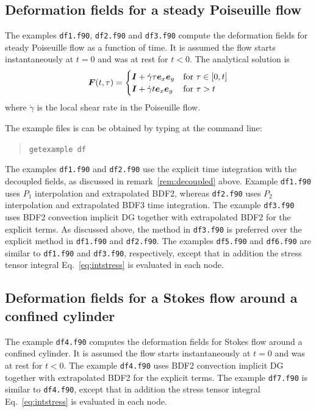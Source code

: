 \subsection{Deformation fields for a steady Poiseuille flow}
\label{sec:df_Poiseuille_steady}

The examples \texttt{df1.f90}, \texttt{df2.f90} and \texttt{df3.f90} compute the deformation fields for steady Poiseuille flow as a function of time. It is assumed the flow starts instantaneously at $t=0$ and was at rest for $t<0$. The analytical solution is 
\begin{equation}
    \boldsymbol{F}(t,\tau) = 
\begin{cases}
      \boldsymbol{I} + \dot\gamma\tau\boldsymbol{e}_x\boldsymbol{e}_y  & \text{for }\tau \in [0,t] \\
      \boldsymbol{I} + \dot\gamma t \boldsymbol{e}_x\boldsymbol{e}_y & \text{for }\tau > t
\end{cases}
\label{eq:steadyFshear}
\end{equation}
where $\dot\gamma$ is the local shear rate in the Poiseuille flow.

The example files is can be obtained by typing at the
command line:
\medskip
\begin{quote}
   \texttt{getexample df}
\end{quote}

The examples \texttt{df1.f90} and \texttt{df2.f90} use the explicit time integration with the decoupled fields, as discussed in remark~\ref{rem:decoupled} above. 
Example \texttt{df1.f90} uses $P_1$ interpolation and 
extrapolated BDF2, whereas \texttt{df2.f90} uses $P_2$ interpolation and 
extrapolated BDF3 time integration. The example \texttt{df3.f90} uses BDF2 convection implicit DG together with extrapolated BDF2 for the explicit terms. As discussed above, the method in \texttt{df3.f90} is preferred over the explicit method in \texttt{df1.f90} and \texttt{df2.f90}.
The examples \texttt{df5.f90} and \texttt{df6.f90} are similar to \texttt{df1.f90} and \texttt{df3.f90}, respectively, except that in addition the stress tensor 
integral Eq.~\eqref{eq:intstress} is evaluated in each node.

\subsection{Deformation fields for a Stokes flow around a confined cylinder}
\label{sec:df_confined_cylinder}

The example \texttt{df4.f90} computes the deformation fields for Stokes flow around a confined cylinder. It is assumed the flow starts instantaneously at $t=0$ and was at rest for $t<0$. The example \texttt{df4.f90} uses BDF2 convection implicit DG together with extrapolated BDF2 for the explicit terms.
The example \texttt{df7.f90} is similar to \texttt{df4.f90}, except that in addition 
the stress tensor integral Eq.~\eqref{eq:intstress} is evaluated in each node.

